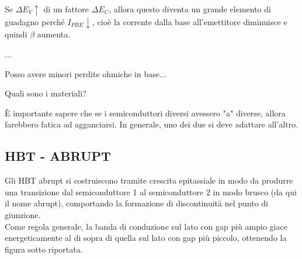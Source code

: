 Se $\Delta E_V \uparrow$ di un fattore $\Delta E_C$, allora questo diventa un grande elemento di guadagno perché $I_{PBE} \downarrow$, cioè la corrente dalla base all'emettitore diminuisce e quindi $\beta$ aumenta.

...

Posso avere minori perdite ohmiche in base...

Quali sono i materiali?

È importante sapere che se i semiconduttori diversi avessero "a" diverse, allora farebbero fatica ad agganciarsi. In generale, uno dei due si deve adattare all'altro.

\cleardoublepage
\subsection{HBT - ABRUPT}
Gli HBT abrupt si costruiscono tramite crescita epitassiale in modo da produrre una transizione dal semiconduttore 1 al semiconduttore 2 in modo brusco (da qui il nome abrupt), comportando la formazione di discontinuità nel punto di giunzione.\\
Come regola generale, la banda di conduzione sul lato con gap più ampio giace energeticamente al di sopra di quella sul lato con gap più piccolo, ottenendo la figura sotto riportata.

